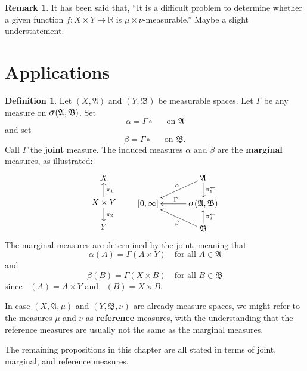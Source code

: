 \documentclass[
twoside=true,
paper=letter,
fontsize=9pt,
pagesize=auto,
leqno,
openany,
headsepline,
overfullrule,
]{scrbook}
\theoremstyle{plain}
\theoremstyle{plain}
\theoremstyle{definition}
\newtheorem{defn}[thm]{Definition}
\newtheorem{rmk}[thm]{Remark}
\theoremstyle{bfnoteitalic}
\theoremstyle{bfnoteroman}
\newcommand{\sigalg}[1]{\mathfrak{#1}}
\newcommand{\sagb}{\mathop{\hbox{\large{$\sigma$}}}\nolimits}
\newcommand{\preimage}[1]{\mathop{#1^{\leftarrow}}}
\newcommand{\R}{\mathbb{R}}
\newcommand{\sigmaalgebra}{\sigalg{A}}
\newcommand{\sigmaalgebraii}{\sigalg{B}}
\newcommand{\productsig}[2]{\sagb(#1,#2)}
\newcommand{\function}{f}
\newcommand{\measurespace}{X}
\newcommand{\measurespaceii}{Y}
\newcommand{\measmu}{\mu}
\newcommand{\measnu}{\nu}
\newcommand{\seti}{A}
\newcommand{\setii}{B}
\newcommand{\projectionone}{\pi_1}
\newcommand{\projectiontwo}{\pi_2}
\newcommand{\measonprod}{\Gamma}%
\newcommand{\marginalone}{\alpha}%
\newcommand{\marginaltwo}{\beta}%
\begin{document}
\begin{rmk}
It has been said that, ``It is a difficult problem to determine whether a given function 
$\function:\measurespace\times\measurespaceii\to\R$ is $\measmu\times\measnu$-measurable.''
Maybe a slight understatement.
\end{rmk}



\section{Applications}\label{product_integration_applications}





\begin{defn}\label{marginals}
Let $(\measurespace,\sigmaalgebra)$ and 
$(\measurespaceii,\sigmaalgebraii)$ be measurable spaces.
Let $\measonprod$ be any measure on
$\productsig{\sigmaalgebra}{\sigmaalgebraii}$.
Set
\[
\marginalone
=
\measonprod \circ \preimage{\projectionone}
\quad
\text{on }
\sigmaalgebra
\]
and set
\[
\marginaltwo
=
\measonprod \circ \preimage{\projectiontwo}
\quad
\text{on }
\sigmaalgebraii.
\]
Call $\measonprod$ the \textbf{joint} measure.
The induced measures
$\marginalone$ and $\marginaltwo$ are the \textbf{marginal} measures, as illustrated:
\[
\xymatrix@R=16pt@C=30pt{
\measurespace 
\\
\measurespace\times\measurespaceii 
\ar[u]_{\projectionone}
\ar[d]^{\projectiontwo} 
\\
\measurespaceii
}
\qquad
\xymatrix@R=16pt@C=30pt{ 
 & \sigmaalgebra 
 \ar[d]^-{\preimage{\projectionone}} 
 \ar[dl]_-{\marginalone} 
\\
[0,\infty] 
& \productsig{\sigmaalgebra}{\sigmaalgebraii} \ar[l]_{\measonprod}
\\
 & \sigmaalgebraii \ar[u]_-{\preimage{\projectiontwo}} 
 \ar[ul]^-{\marginaltwo}
\\
}
\]
The marginal measures are determined by the joint,
meaning that
\[
\marginalone(\seti)=\measonprod(\seti\times\measurespaceii)
\quad
\text{for all $\seti\in\sigmaalgebra$}
\]
and
\[
\marginaltwo(\setii)=\measonprod(\measurespace\times\setii)
\quad
\text{for all $\setii\in\sigmaalgebraii$}
\]
since
$\preimage{\projectionone}(\seti) = \seti\times\measurespaceii$
and
$\preimage{\projectiontwo}(\setii) = \measurespace\times\setii$.


In case  $(\measurespace,\sigmaalgebra,\measmu)$ and
$(\measurespaceii,\sigmaalgebraii,\measnu)$ are already measure spaces, we might refer to the measures
$\measmu$ and $\measnu$ as \textbf{reference} measures, with the understanding that the reference measures are usually not the same as the marginal measures.

The remaining propositions in this chapter are all stated in terms of joint, marginal, and reference measures.
\end{defn}
\end{document}
